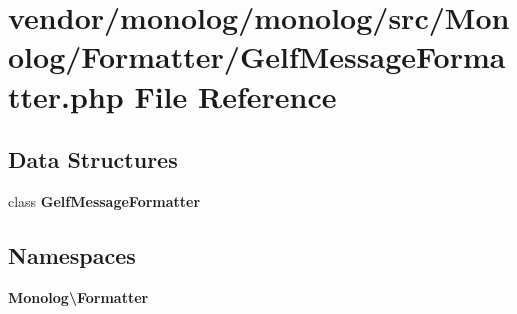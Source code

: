 \section{vendor/monolog/monolog/src/\+Monolog/\+Formatter/\+Gelf\+Message\+Formatter.php File Reference}
\label{_gelf_message_formatter_8php}
\subsection*{Data Structures}
\begin{DoxyCompactItemize}
\item 
class {\bf Gelf\+Message\+Formatter}
\end{DoxyCompactItemize}
\subsection*{Namespaces}
\begin{DoxyCompactItemize}
\item 
 {\bf Monolog\textbackslash{}\+Formatter}
\end{DoxyCompactItemize}
